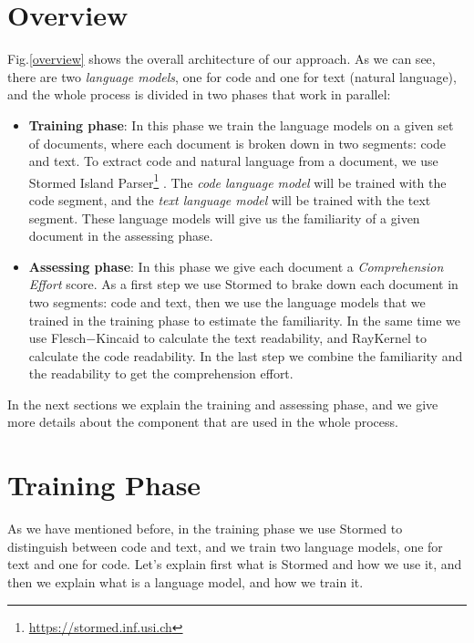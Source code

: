 \documentclass[12pt,mscthesis]{usiinfthesis}
\begin{document}
	\section{Overview}

	Fig.\ref{overview} shows the overall architecture of our approach. As we can see, there are two \emph{language models}, one for code and one for text (natural language), and the whole process is divided in two phases that work in parallel: 
	\begin{itemize}

		\item \textbf{Training phase}: In this phase we train the language models on a given set of documents, where each document is broken down in two segments: code and text. To extract code and natural language from a document, we use Stormed Island Parser\footnote{\url{https://stormed.inf.usi.ch}} \cite{Ponz2015a}. The \emph{code language model} will be trained with the code segment, and the \emph{text language model} will be trained with the text segment. These language models will give us the familiarity of a given document in the assessing phase.


		\item \textbf{Assessing phase}: In this phase we give each document a \emph{Comprehension Effort} score. As a first step we use Stormed \cite{Ponz2015a} to brake down each document in two segments: code and text, then we use the language models that we trained in the training phase to estimate the familiarity. In the same time we use Flesch$-$Kincaid to calculate the text readability, and RayKernel \cite{Buse:2010:LMC:1850489.1850615} to calculate the code readability. In the last step we combine the familiarity and the readability to get the comprehension effort.
	
	\end{itemize}

	In the next sections we explain the training and assessing phase, and we give more details about the component that are used in the whole process.

	\section{Training Phase}

	As we have mentioned before, in the training phase we use Stormed to distinguish between code and text, and we train two language models, one for text and one for code. Let's explain first what is Stormed and how we use it, and then we explain what is a language model, and how we train it.
\end{document}
